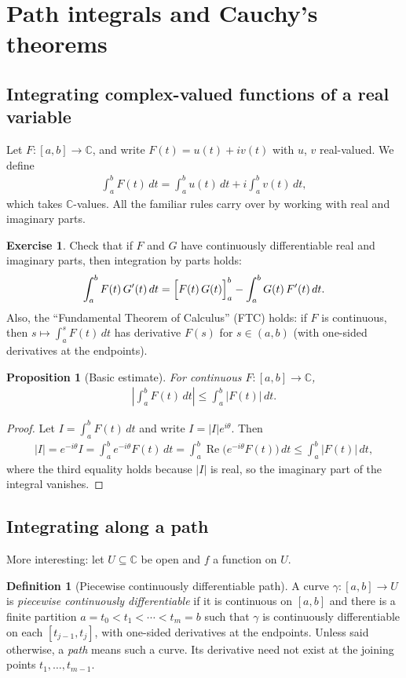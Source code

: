 \documentclass[11pt]{article}
\theoremstyle{plain}
\newtheorem{proposition}[theorem]{Proposition}
\theoremstyle{definition}
\newtheorem{definition}[theorem]{Definition}
\newtheorem{exercise}[theorem]{Exercise}
\theoremstyle{remark}
\numberwithin{equation}{section}
\newcommand{\be}{\begin{eqnarray}}
\newcommand{\ee}{\end{eqnarray}}
\newcommand{\C}{\mathbb{C}}
\DeclareMathOperator{\Real}{Re}
\begin{document}
\section{Path integrals and Cauchy's theorems}
\subsection*{Integrating complex-valued functions of a real variable}
Let $F\colon[a,b]\to\C$, and write $F(t)=u(t)+iv(t)$ with $u$, $v$
real-valued. We define
\be
 \int_a^bF(t)\,dt=\int_a^bu(t)\,dt+i\int_a^bv(t)\,dt,
\ee
which takes $\C$-values. All the familiar rules carry over by working with
real and imaginary parts.

\begin{exercise}
Check that if $F$ and $G$ have continuously differentiable real and
imaginary parts, then integration by parts holds:
\be
 \int_a^bF(t)\,G'(t)\,dt=\Bigl[F(t)\,G(t)\Bigr]_a^b-\int_a^bG(t)\,F'(t)\,dt.
\ee
Also, the ``Fundamental Theorem of Calculus'' (FTC) holds: if $F$ is continuous, then
$s\mapsto\int_a^sF(t)\,dt$ has derivative $F(s)$ for $s\in(a,b)$ (with
one-sided derivatives at the endpoints).
\end{exercise}

\begin{proposition}[Basic estimate]
\label{prop:basic-est}
For continuous $F\colon[a,b]\to\C$,
\be
 \left|\int_a^bF(t)\,dt\right|\leq\int_a^b|F(t)|\,dt.
\ee
\end{proposition}

\begin{proof}
Let $I=\int_a^bF(t)\,dt$ and write $I=|I|e^{i\theta}$. Then
\be
 |I|=e^{-i\theta}I=\int_a^b e^{-i\theta}F(t)\,dt
 =\int_a^b\Real\bigl(e^{-i\theta}F(t)\bigr)\,dt
 \leq\int_a^b|F(t)|\,dt,
\ee
where the third equality holds because $|I|$ is real, so the imaginary part
of the integral vanishes.
\end{proof}

\subsection*{Integrating along a path}
More interesting: let $U\subseteq\C$ be open and $f$ a function on $U$.

\begin{definition}[Piecewise continuously differentiable path]
A curve $\gamma\colon[a,b]\to U$ is \emph{piecewise continuously differentiable}
if it is continuous on $[a,b]$ and there is a finite partition
$a=t_0<t_1<\cdots<t_m=b$ such that $\gamma$ is continuously differentiable
on each $[t_{j-1},t_j]$, with one-sided derivatives at the endpoints.
Unless said otherwise, a \emph{path} means such a curve. Its derivative
need not exist at the joining points $t_1,\ldots,t_{m-1}$.
\end{definition}
\end{document}
